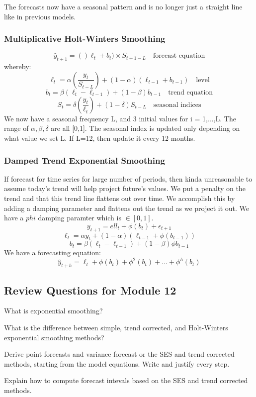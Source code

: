 \documentclass[11pt, oneside]{article}
\theoremstyle{definition}
\begin{document}
The forecasts now have a seasonal pattern and is no longer just a straight line like in previous models.

\subsubsection{Multiplicative Holt-Winters Smoothing}
$$
\hat{y}_{t+1} = ()\ell_t + b_t) \times S_{t+1-L}\quad \text{forecast equation}
$$
whereby:
$$
\ell_t = \alpha(\frac{y_t}{S_{t-L}}) + (1-\alpha)(\ell_{t-1}+b_{t-1}) \quad \text{level}
$$
$$
b_t = \beta(\ell_t - \ell_{t-1}) + (1-\beta)b_{t-1} \quad \text{trend equation}
$$
$$
S_t = \delta(\frac{y_t}{\ell_t}) + (1 - \delta)S_{t-L} \quad \text{seasonal indices}
$$
We now have a seasonal frequency L, and 3 initial values for i = 1,...,L. The range of $\alpha, \beta, \delta$ are all [0,1].
The seasonal index is updated only depending on what value we set L. If L=12, then update it every 12 months.

\subsubsection{Damped Trend Exponential Smoothing}
If forecast for time series for large number of periods, then kinda unreasonable to assume today's trend will help project future's values. We put a penalty on the trend and that this trend line flattens out over time. We accomplish this by adding a damping parameter and flattens out the trend as we project it out. We have a $phi$ damping paramter which is $\in [0,1]$.
$$
y_{t+1} = ell_t + \phi(b_t) + \epsilon_{t+1}
$$
$$
\ell_t = \alpha y_t + (1-\alpha)(\ell_{t-1} + \phi(b_{t-1}))
$$
$$
b_t = \beta(\ell_t - \ell_{t-1}) + (1 - \beta)\phi b_{t-1}
$$
We have a forecasting equation:
$$
\hat{y}_{t+h} = \ell_t + \phi(b_t) + \phi^2(b_t) + ... + \phi^h(b_t)
$$

\subsection{Review Questions for Module 12}
What is exponential smoothing?

What is the difference between simple, trend corrected, and Holt-Winters exponential smoothing methods?

Derive point forecasts and variance forecast or the SES and trend corrected methods, starting from the model equations. Write and justify every step.

Explain how to compute forecast intevals based on the SES and trend corrected methods.
\end{document}
